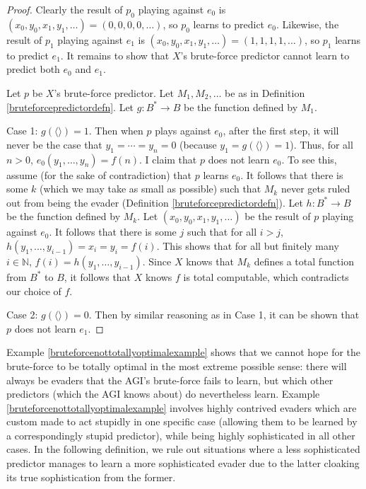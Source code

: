 \documentclass{article}
\begin{document}
\begin{proof}
    Clearly the result of $p_0$ playing against $e_0$ is
    $(x_0,y_0,x_1,y_1,\ldots)=(0,0,0,0,\ldots)$, so $p_0$ learns to predict $e_0$.
    Likewise, the result of $p_1$ playing against $e_1$ is
    $(x_0,y_0,x_1,y_1,\ldots)=(1,1,1,1,\ldots)$, so $p_1$ learns to predict $e_1$.
    It remains to show that $X$'s brute-force predictor cannot learn to predict
    both $e_0$ and $e_1$.

    Let $p$ be $X$'s brute-force predictor.
    Let $M_1,M_2,\ldots$ be as in Definition \ref{bruteforcepredictordefn}.
    Let $g:B^*\to B$ be the function defined by $M_1$.

    Case 1: $g(\langle\rangle)=1$. Then when $p$ plays against $e_0$,
    after the first step, it will never be the case that
    $y_1=\cdots=y_n=0$ (because $y_1=g(\langle\rangle)=1$).
    Thus, for all $n>0$, $e_0(y_1,\ldots,y_n)=f(n)$.
    I claim that $p$ does not learn $e_0$.
    To see this, assume (for the sake of contradiction)
    that $p$ learns $e_0$. It follows that there is some $k$ (which we may take
    as small as possible) such that $M_k$ never gets ruled out from being the
    evader (Definition \ref{bruteforcepredictordefn}). Let $h:B^*\to B$ be the
    function defined by $M_k$.
    Let $(x_0,y_0,x_1,y_1,\ldots)$ be the result of $p$ playing against $e_0$.
    It follows that there is some $j$ such that for all $i>j$,
    $h(y_1,\ldots,y_{i-1})=x_i=y_i=f(i)$.
    This shows that for all but finitely many $i\in\mathbb N$,
    $f(i)=h(y_1,\ldots,y_{i-1})$. Since $X$ knows that $M_k$ defines a total
    function from $B^*$ to $B$, it follows that $X$ knows $f$ is total computable,
    which contradicts our choice of $f$.

    Case 2: $g(\langle\rangle)=0$. Then by similar reasoning as in Case 1,
    it can be shown that $p$ does not learn $e_1$.
\end{proof}

Example \ref{bruteforcenottotallyoptimalexample} shows that we cannot
hope for the brute-force to be totally optimal in the most extreme possible sense:
there will always be evaders that the AGI's brute-force fails to learn, but which other
predictors (which the AGI knows about)
do nevertheless learn. Example \ref{bruteforcenottotallyoptimalexample} involves
highly contrived evaders which are custom made to act stupidly in one specific case
(allowing them to be learned by a correspondingly stupid predictor), while being
highly sophisticated in all other cases. In the following definition, we rule out
situations where a less sophisticated predictor manages to learn a
more sophisticated evader due to the latter cloaking its true sophistication from
the former.
\end{document}

